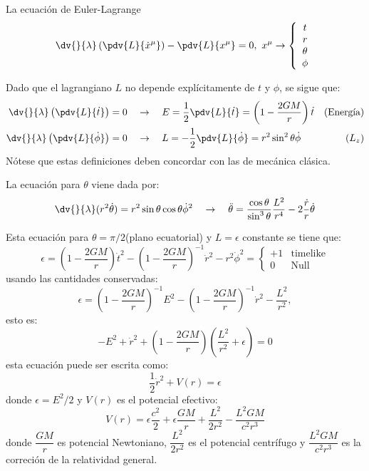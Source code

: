 \documentclass[../main]{subfiles}
\begin{document}
La ecuación de Euler-Lagrange
\begin{equation}
    \dv{}{\lambda}\left(\pdv{L}{\dot{x}^{\mu}}\right)-\pdv{L}{x^{\mu}}=0, \ x^{\mu}\rightarrow 
    \left\{
    \begin{array}{c}
       t\\
       r\\
       \theta\\
       \phi 
    \end{array}
    \right.
\end{equation}

Dado que el lagrangiano $L$ no depende explícitamente de $t$ y $\phi$, se sigue que:
\begin{align}
    \dv{}{\lambda}\left(\pdv{L}{\dot{t}}\right)&=0 \quad \rightarrow \quad E=\dfrac{1}{2}\pdv{L}{\dot{t}}=\left(1-\dfrac{2GM}{r}\right)\dot{t}  &(\text{Energía})\\
    \dv{}{\lambda}\left(\pdv{L}{\dot{\phi}}\right)&=0 \quad \rightarrow \quad L=-\dfrac{1}{2}\pdv{L}{\dot{\phi}}=r^2\sin^2 \theta \dot{\phi}  &(L_z) 
\end{align}
Nótese que estas definiciones deben concordar con las de mecánica clásica.

La ecuación para $\theta$ viene dada por:
\begin{equation}
    \dv{}{\lambda}(r^2 \dot{\theta})=r^2\sin \theta \cos \theta \dot{\phi}^2 \quad \rightarrow \quad \ddot{\theta}=\dfrac{\cos \theta}{\sin^3 \theta} \dfrac{L^2}{r^4}-2\dfrac{\dot{r}}{r}\dot{\theta}
\end{equation}

Esta ecuación para $\theta=\pi/2$(plano ecuatorial) y $L=\epsilon$ constante se tiene que:
\begin{equation}
    \epsilon=\left(1-\dfrac{2GM}{r}\right)\dot{t}^2-\left(1-\dfrac{2GM}{r}\right)^{-1}\dot{r}^2-r^2\dot{\phi}^2=
    \left\{
    \begin{array}{cc}
        +1 & \text{timelike}\\
        0  & \text{Null}
    \end{array}
    \right.
\end{equation}
usando las cantidades conservadas:
\begin{equation}
    \epsilon = \left(1-\dfrac{2GM}{r}\right)^{-1} E^2-\left(1-\dfrac{2GM}{r}\right)^{-1}\dot{r}^2-\dfrac{L^2}{r^2},
\end{equation}
esto es:
\begin{equation}
    -E^2+\dot{r}^2+\left(1-\dfrac{2GM}{r}\right)\left(\dfrac{L^2}{r^2}+\epsilon\right)=0
\end{equation}
esta ecuación puede ser escrita como:
\begin{equation}
    \dfrac{1}{2}\dot{r}^2+V(r)=\epsilon
\end{equation}
donde $\epsilon=E^2/2$ y $V(r)$ es el potencial efectivo:
\begin{equation}
    V(r)=\epsilon\dfrac{c^2}{2}+\epsilon\dfrac{GM}{r}+\dfrac{L^2}{2r^2}-\dfrac{L^2 GM}{c^2 r^3}
\end{equation}
donde $\dfrac{GM}{r}$ es potencial Newtoniano, $\dfrac{L^2}{2r^2}$ es el potencial centrífugo y $\dfrac{L^2 GM}{c^2 r^3}$ es la correción de la relatividad general.
\end{document}
